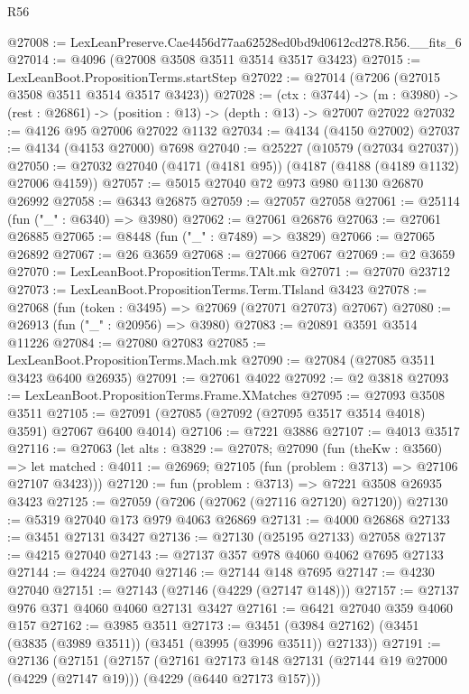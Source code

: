 \begin{lexlean}{R56}
\begin{coremodule}
@27008 := LexLeanPreserve.Cae4456d77aa62528ed0bd9d0612cd278.R56.__fits_6
@27014 := @4096 (@27008 @3508 @3511 @3514 @3517 @3423)
@27015 := LexLeanBoot.PropositionTerms.startStep
@27022 := @27014 (@7206 (@27015 @3508 @3511 @3514 @3517 @3423))
@27028 := (ctx : @3744) ->
  (m : @3980) -> (rest : @26861) -> (position : @13) -> (depth : @13) -> @27007 @27022
@27032 := @4126 @95 @27006 @27022 @1132
@27034 := @4134 (@4150 @27002)
@27037 := @4134 (@4153 @27000) @7698
@27040 := @25227 (@10579 (@27034 @27037))
@27050 := @27032 @27040 (@4171 (@4181 @95)) (@4187 (@4188 (@4189 @1132) @27006 @4159))
@27057 := @5015 @27040 @72 @973 @980 @1130 @26870 @26992
@27058 := @6343 @26875
@27059 := @27057 @27058
@27061 := @25114 (fun ("_" : @6340) => @3980)
@27062 := @27061 @26876
@27063 := @27061 @26885
@27065 := @8448 (fun ("_" : @7489) => @3829)
@27066 := @27065 @26892
@27067 := @26 @3659
@27068 := @27066 @27067
@27069 := @2 @3659
@27070 := LexLeanBoot.PropositionTerms.TAlt.mk
@27071 := @27070 @23712
@27073 := LexLeanBoot.PropositionTerms.Term.TIsland @3423
@27078 := @27068 (fun (token : @3495) => @27069 (@27071 @27073) @27067)
@27080 := @26913 (fun ("_" : @20956) => @3980)
@27083 := @20891 @3591 @3514 @11226
@27084 := @27080 @27083
@27085 := LexLeanBoot.PropositionTerms.Mach.mk
@27090 := @27084 (@27085 @3511 @3423 @6400 @26935)
@27091 := @27061 @4022
@27092 := @2 @3818
@27093 := LexLeanBoot.PropositionTerms.Frame.XMatches
@27095 := @27093 @3508 @3511
@27105 := @27091 (@27085 (@27092 (@27095 @3517 @3514 @4018) @3591) @27067 @6400 @4014)
@27106 := @7221 @3886
@27107 := @4013 @3517
@27116 := @27063
    (let alts : @3829 := @27078;
    @27090
      (fun (theKw : @3560) =>
      let matched : @4011 := @26969; @27105 (fun (problem : @3713) => @27106 @27107 @3423)))
@27120 := fun (problem : @3713) => @7221 @3508 @26935 @3423
@27125 := @27059 (@7206 (@27062 (@27116 @27120) @27120))
@27130 := @5319 @27040 @173 @979 @4063 @26869
@27131 := @4000 @26868
@27133 := @3451 @27131 @3427
@27136 := @27130 (@25195 @27133) @27058
@27137 := @4215 @27040
@27143 := @27137 @357 @978 @4060 @4062 @7695 @27133
@27144 := @4224 @27040
@27146 := @27144 @148 @7695
@27147 := @4230 @27040
@27151 := @27143 (@27146 (@4229 (@27147 @148)))
@27157 := @27137 @976 @371 @4060 @4060 @27131 @3427
@27161 := @6421 @27040 @359 @4060 @157
@27162 := @3985 @3511
@27173 := @3451 (@3984 @27162) (@3451 (@3835 (@3989 @3511)) (@3451 (@3995 (@3996 @3511)) @27133))
@27191 := @27136
    (@27151
      (@27157
        (@27161
          @27173
          @148
          @27131
          (@27144 @19 @27000 (@4229 (@27147 @19)))
          (@4229 (@6440 @27173 @157)))

\end{coremodule}
\end{lexlean}
